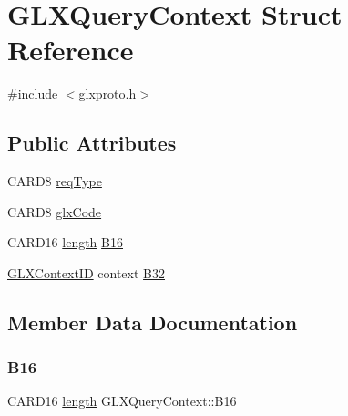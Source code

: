 \hypertarget{struct_g_l_x_query_context}{}\section{G\+L\+X\+Query\+Context Struct Reference}
\label{struct_g_l_x_query_context}


{\ttfamily \#include $<$glxproto.\+h$>$}

\subsection*{Public Attributes}
\begin{DoxyCompactItemize}
\item 
C\+A\+R\+D8 \hyperlink{struct_g_l_x_query_context_a0edfc4ac725cb5030dc3de28a044c4b3}{req\+Type}
\item 
C\+A\+R\+D8 \hyperlink{struct_g_l_x_query_context_a159b7ac1416434d6d51776b0f7027023}{glx\+Code}
\item 
C\+A\+R\+D16 \hyperlink{glcorearb_8h_ab9c919755bde3b34349e23a32b4e0fa7}{length} \hyperlink{struct_g_l_x_query_context_a444071b17e01ab61c067132610219e12}{B16}
\item 
\hyperlink{glx_8h_a17c7ca5b76cc448032df0b5352803005}{G\+L\+X\+Context\+ID} context \hyperlink{struct_g_l_x_query_context_ae107b5c1456d5da05997fe1a8ce19abc}{B32}
\end{DoxyCompactItemize}


\subsection{Member Data Documentation}
\mbox{\label{struct_g_l_x_query_context_a444071b17e01ab61c067132610219e12}} 
\subsubsection{\texorpdfstring{B16}{B16}}
{\footnotesize\ttfamily C\+A\+R\+D16 \hyperlink{glcorearb_8h_ab9c919755bde3b34349e23a32b4e0fa7}{length} G\+L\+X\+Query\+Context\+::\+B16}

\mbox{\label{struct_g_l_x_query_context_ae107b5c1456d5da05997fe1a8ce19abc}} 
